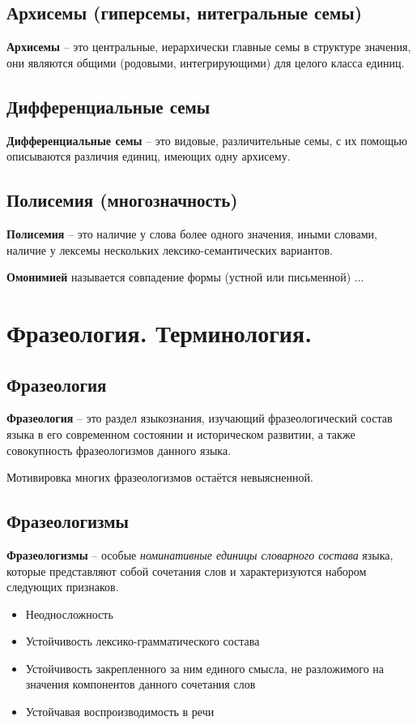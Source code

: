 \documentclass{article}
\begin{document}
\subsection{Архисемы (гиперсемы, нитегральные семы)}
\textbf{Архисемы} -- это центральные, иерархически главные семы в структуре значения,
они являются общими (родовыми, интегрирующими) для целого класса единиц.

\subsection{Дифференциальные семы}
\textbf{Дифференциальные семы} -- это видовые, различительные семы, с их помощью описываются различия
единиц, имеющих одну архисему.

\subsection{Полисемия (многозначность)}
\textbf{Полисемия} -- это наличие у слова более одного значения, иными словами, наличие у лексемы
нескольких лексико-семантических вариантов.

\textbf{Омонимией} называется совпадение формы (устной или письменной) ...

\section{Фразеология. Терминология.}

\subsection{Фразеология}

\textbf{Фразеология} -- это раздел языкознания, изучающий фразеологический состав языка в его современном
состоянии и историческом развитии, а также совокупность фразеологизмов данного языка.

Мотивировка многих фразеологизмов остаётся невыясненной.

\subsection{Фразеологизмы}

\textbf{Фразеологизмы} -- особые \textit{номинативные единицы словарного состава}
языка, которые представляют собой сочетания слов и характеризуются набором
следующих признаков.

\begin{itemize}
    \item Неодносложность
    \item Устойчивость лексико-грамматического состава
    \item Устойчивость закрепленного за ним единого смысла, не разложимого на
    значения компонентов данного сочетания слов
    \item Устойчавая воспроизводимость в речи
\end{itemize}
\end{document}
